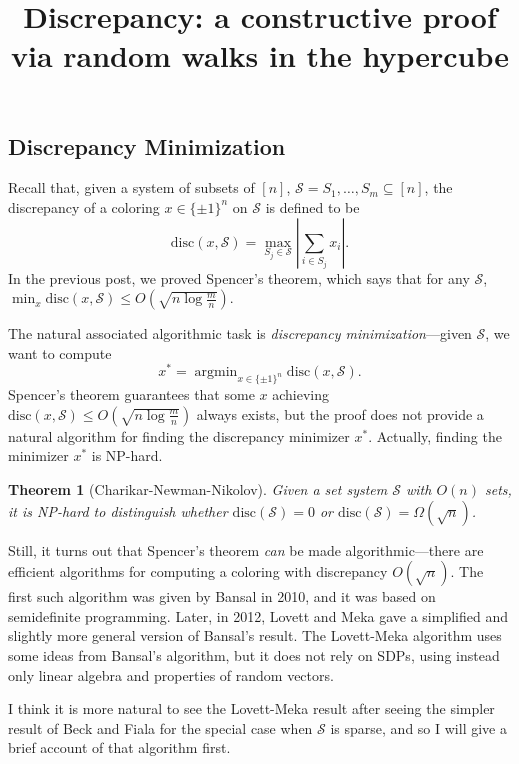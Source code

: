 \documentclass{article}
\title{Discrepancy: a constructive proof via random walks in the hypercube}
\date{}
\theoremstyle{theorem}
\newtheorem{theorem}{Theorem}
\theoremstyle{definition}
\newcommand{\disc}{\mathrm{disc}}
\newcommand{\cS}{\mathcal{S}}
\newcommand{\argmin}{\mathop{\mathrm{argmin}}}
\begin{document}
\maketitle


\subsection*{Discrepancy Minimization}
Recall that, given a system of subsets of $[n]$, $\cS = S_1,\ldots,S_m \subseteq [n]$, the discrepancy of a coloring $x \in \{\pm 1\}^n$ on $\cS$ is defined to be
\[
    \disc(x,\cS) = \max_{S_j \in \cS} \left|\sum_{i \in S_j} x_i\right|.
\]
In the previous post, we proved Spencer's theorem, which says that for any $\cS$, $\min_{x}\disc(x,\cS) \le O(\sqrt{n\log\frac{m}{n}})$.

The natural associated algorithmic task is \emph{discrepancy minimization}---given $\cS$, we want to compute
\[
    x^* = \argmin_{x \in \{\pm 1\}^n} \disc(x,\cS).
\]
Spencer's theorem guarantees that some $x$ achieving $\disc(x,\cS) \le O(\sqrt{n\log\frac{m}{n}})$ always exists, but the proof does not provide a natural algorithm for finding the discrepancy minimizer $x^*$.
Actually, finding the minimizer $x^*$ is NP-hard.
\begin{theorem}[Charikar-Newman-Nikolov]
    Given a set system $\cS$ with $O(n)$ sets, it is NP-hard to distinguish whether $\disc(\cS) = 0$ or $\disc(\cS) = \Omega(\sqrt{n})$.
\end{theorem}

Still, it turns out that Spencer's theorem \emph{can} be made algorithmic---there are efficient algorithms for computing a coloring with discrepancy $O(\sqrt{n})$.
The first such algorithm was given by Bansal in 2010, and it was based on semidefinite programming.
Later, in 2012, Lovett and Meka gave a simplified and slightly more general version of Bansal's result.
The Lovett-Meka algorithm uses some ideas from Bansal's algorithm, but it does not rely on SDPs, using instead only linear algebra and properties of random vectors.

I think it is more natural to see the Lovett-Meka result after seeing the simpler result of Beck and Fiala for the special case when $\cS$ is sparse, and so I will give a brief account of that algorithm first.
\end{document}
